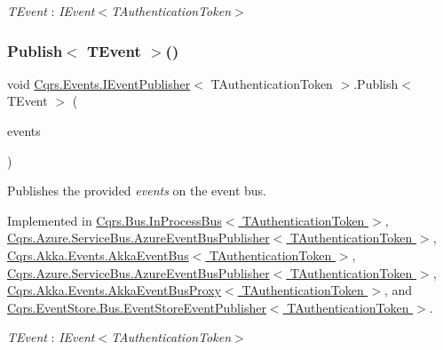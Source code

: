 \begin{Desc}
\item[Type Constraints]\begin{description}
\item[{\em T\+Event} : {\em I\+Event$<$T\+Authentication\+Token$>$}]\end{description}
\end{Desc}
\mbox{\label{interfaceCqrs_1_1Events_1_1IEventPublisher_a2cbcc3d2c24d015abef6337714ec51ff_a2cbcc3d2c24d015abef6337714ec51ff}} 
\subsubsection{\texorpdfstring{Publish$<$ T\+Event $>$()}{Publish< TEvent >()}\hspace{0.1cm}{\footnotesize\ttfamily [2/2]}}
{\footnotesize\ttfamily void \hyperlink{interfaceCqrs_1_1Events_1_1IEventPublisher}{Cqrs.\+Events.\+I\+Event\+Publisher}$<$ T\+Authentication\+Token $>$.Publish$<$ T\+Event $>$ (\begin{DoxyParamCaption}\item[{I\+Enumerable$<$ T\+Event $>$}]{events }\end{DoxyParamCaption})}



Publishes the provided {\itshape events}  on the event bus. 



Implemented in \hyperlink{classCqrs_1_1Bus_1_1InProcessBus_ae154f274db2a028a6094677d83cc1c74_ae154f274db2a028a6094677d83cc1c74}{Cqrs.\+Bus.\+In\+Process\+Bus$<$ T\+Authentication\+Token $>$}, \hyperlink{classCqrs_1_1Azure_1_1ServiceBus_1_1AzureEventBusPublisher_a8bb9cd1172e7dec117cde75eb6b0f056_a8bb9cd1172e7dec117cde75eb6b0f056}{Cqrs.\+Azure.\+Service\+Bus.\+Azure\+Event\+Bus\+Publisher$<$ T\+Authentication\+Token $>$}, \hyperlink{classCqrs_1_1Akka_1_1Events_1_1AkkaEventBus_ad5b996dd77efbf51a2b5a32f94417772_ad5b996dd77efbf51a2b5a32f94417772}{Cqrs.\+Akka.\+Events.\+Akka\+Event\+Bus$<$ T\+Authentication\+Token $>$}, \hyperlink{classCqrs_1_1Azure_1_1ServiceBus_1_1AzureEventBusPublisher_a8bb9cd1172e7dec117cde75eb6b0f056_a8bb9cd1172e7dec117cde75eb6b0f056}{Cqrs.\+Azure.\+Service\+Bus.\+Azure\+Event\+Bus\+Publisher$<$ T\+Authentication\+Token $>$}, \hyperlink{classCqrs_1_1Akka_1_1Events_1_1AkkaEventBusProxy_af4c202eaab00ed2fb6160d5b114d935c_af4c202eaab00ed2fb6160d5b114d935c}{Cqrs.\+Akka.\+Events.\+Akka\+Event\+Bus\+Proxy$<$ T\+Authentication\+Token $>$}, and \hyperlink{classCqrs_1_1EventStore_1_1Bus_1_1EventStoreEventPublisher_a85b4922ff01b088b01b39463681c6eb6_a85b4922ff01b088b01b39463681c6eb6}{Cqrs.\+Event\+Store.\+Bus.\+Event\+Store\+Event\+Publisher$<$ T\+Authentication\+Token $>$}.

\begin{Desc}
\item[Type Constraints]\begin{description}
\item[{\em T\+Event} : {\em I\+Event$<$T\+Authentication\+Token$>$}]\end{description}
\end{Desc}
